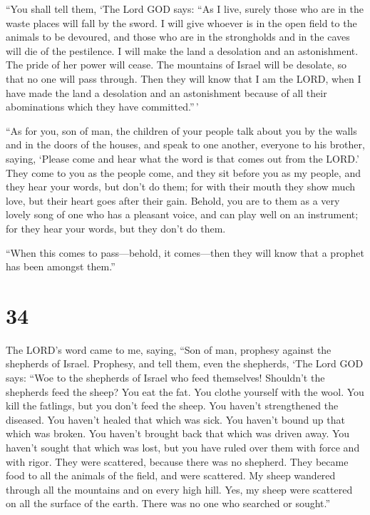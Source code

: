  ``You shall tell them, `The Lord GOD says: ``As I live,
surely those who are in the waste places will fall by the sword. I will
give whoever is in the open field to the animals to be devoured, and
those who are in the strongholds and in the caves will die of the
pestilence.  I will make the land a desolation and an
astonishment. The pride of her power will cease. The mountains of Israel
will be desolate, so that no one will pass through.  Then
they will know that I am the LORD, when I have made the land a
desolation and an astonishment because of all their abominations which
they have committed.''\,'

 ``As for you, son of man, the children of your people talk
about you by the walls and in the doors of the houses, and speak to one
another, everyone to his brother, saying, `Please come and hear what the
word is that comes out from the LORD.'  They come to you as
the people come, and they sit before you as my people, and they hear
your words, but don't do them; for with their mouth they show much love,
but their heart goes after their gain.  Behold, you are to
them as a very lovely song of one who has a pleasant voice, and can play
well on an instrument; for they hear your words, but they don't do them.

 ``When this comes to pass---behold, it comes---then they
will know that a prophet has been amongst them.''

\hypertarget{section-32}{%
\section{34}\label{section-32}}

 The LORD's word came to me, saying,  ``Son of
man, prophesy against the shepherds of Israel. Prophesy, and tell them,
even the shepherds, `The Lord GOD says: ``Woe to the shepherds of Israel
who feed themselves! Shouldn't the shepherds feed the sheep?
 You eat the fat. You clothe yourself with the wool. You
kill the fatlings, but you don't feed the sheep.  You
haven't strengthened the diseased. You haven't healed that which was
sick. You haven't bound up that which was broken. You haven't brought
back that which was driven away. You haven't sought that which was lost,
but you have ruled over them with force and with rigor. 
They were scattered, because there was no shepherd. They became food to
all the animals of the field, and were scattered.  My sheep
wandered through all the mountains and on every high hill. Yes, my sheep
were scattered on all the surface of the earth. There was no one who
searched or sought.''

